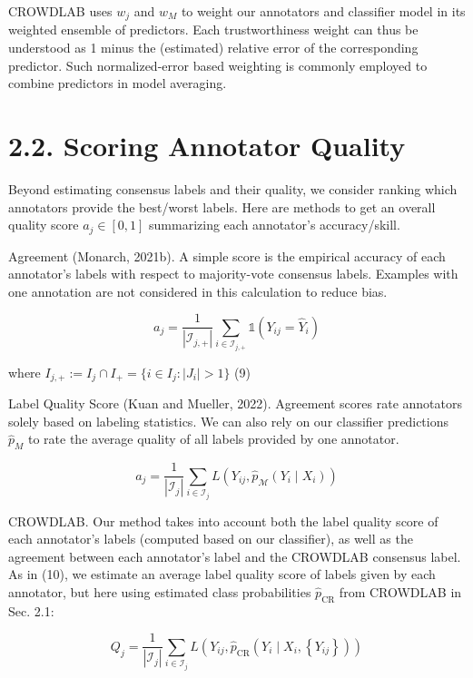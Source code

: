 \documentclass[
]{article}
\begin{document}
CROWDLAB uses \(w_{j}\) and \(w_{M}\) to weight our annotators and
classifier model in its weighted ensemble of predictors. Each
trustworthiness weight can thus be understood as 1 minus the (estimated)
relative error of the corresponding predictor. Such normalized-error
based weighting is commonly employed to combine predictors in model
averaging.

\section{2.2. Scoring Annotator
Quality}\label{scoring-annotator-quality}

Beyond estimating consensus labels and their quality, we consider
ranking which annotators provide the best/worst labels. Here are methods
to get an overall quality score \(a_{j} \in [0, 1]\) summarizing each
annotator's accuracy/skill.

Agreement (Monarch, 2021b). A simple score is the empirical accuracy of
each annotator's labels with respect to majority-vote consensus labels.
Examples with one annotation are not considered in this calculation to
reduce bias.

\[
a _ {j} = \frac {1}{| \mathcal {I} _ {j , +} |} \sum_ {i \in \mathcal {I} _ {j, +}} \mathbb {1} (Y _ {i j} = \widehat {Y} _ {i})
\]

where \(I_{j,+} := I_j \cap I_+ = \{i \in I_j : |J_i| > 1\}\) (9)

Label Quality Score (Kuan and Mueller, 2022). Agreement scores rate
annotators solely based on labeling statistics. We can also rely on our
classifier predictions \(\hat{p}_{M}\) to rate the average quality of
all labels provided by one annotator.

\[
a _ {j} = \frac {1}{\left| \mathcal {I} _ {j} \right|} \sum_ {i \in \mathcal {I} _ {j}} L \left(Y _ {i j}, \widehat {p} _ {\mathcal {M}} \left(Y _ {i} \mid X _ {i}\right)\right) \tag {10}
\]

CROWDLAB. Our method takes into account both the label quality score of
each annotator's labels (computed based on our classifier), as well as
the agreement between each annotator's label and the CROWDLAB consensus
label. As in (10), we estimate an average label quality score of labels
given by each annotator, but here using estimated class probabilities
\(\hat{p}_{\mathrm{CR}}\) from CROWDLAB in Sec. 2.1:

\[
Q _ {j} = \frac {1}{| \mathcal {I} _ {j} |} \sum_ {i \in \mathcal {I} _ {j}} L \left(Y _ {i j}, \hat {p} _ {\mathrm{CR}} \left(Y _ {i} \mid X _ {i}, \left\{Y _ {i j} \right\}\right)\right) \tag {11}
\]
\end{document}

